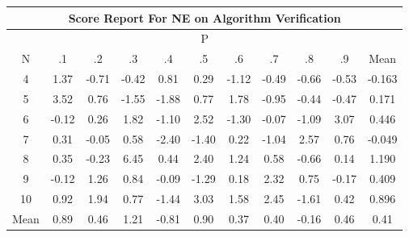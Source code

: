\documentclass[11pt,a4paper]{report}
\begin{document}
\begin{longtable}{ | c || c | c | c | c | c | c | c | c | c || c |}
\hline
\multicolumn{11}{|c|}{ Score Report For NE on Algorithm Verification} \\
\hline
\multicolumn{11}{|c|}{ P } \\
\hline
N & .1 & .2 & .3 & .4 & .5 & .6 & .7 & .8 & .9 & Mean\\
 \hline
 \hline
 \endhead
  4 &  \cellcolor[HTML]{DFDFFF} 1.37 &  \cellcolor[HTML]{FFEFEF} -0.71 &  \cellcolor[HTML]{FFF7F7} -0.42 &  \cellcolor[HTML]{E7E7FF} 0.81 &  \cellcolor[HTML]{F7F7FF} 0.29 &  \cellcolor[HTML]{FFDFDF} -1.12 &  \cellcolor[HTML]{FFEFEF} -0.49 &  \cellcolor[HTML]{FFEFEF} -0.66 &  \cellcolor[HTML]{FFEFEF} -0.53 & -0.163 \\
  5 &  \cellcolor[HTML]{A7A7FF} 3.52 &  \cellcolor[HTML]{EFEFFF} 0.76 &  \cellcolor[HTML]{FFD7D7} -1.55 &  \cellcolor[HTML]{FFCFCF} -1.88 &  \cellcolor[HTML]{EFEFFF} 0.77 &  \cellcolor[HTML]{CFCFFF} 1.78 &  \cellcolor[HTML]{FFE7E7} -0.95 &  \cellcolor[HTML]{FFF7F7} -0.44 &  \cellcolor[HTML]{FFF7F7} -0.47 & 0.171 \\
  6 &  \cellcolor[HTML]{FFFFFF} -0.12 &  \cellcolor[HTML]{F7F7FF} 0.26 &  \cellcolor[HTML]{CFCFFF} 1.82 &  \cellcolor[HTML]{FFE7E7} -1.10 &  \cellcolor[HTML]{BFBFFF} 2.52 &  \cellcolor[HTML]{FFDFDF} -1.30 &  \cellcolor[HTML]{FFFFFF} -0.07 &  \cellcolor[HTML]{FFE7E7} -1.09 &  \cellcolor[HTML]{AFAFFF} 3.07 & 0.446 \\
  7 &  \cellcolor[HTML]{F7F7FF} 0.31 &  \cellcolor[HTML]{FFFFFF} -0.05 &  \cellcolor[HTML]{EFEFFF} 0.58 &  \cellcolor[HTML]{FFBFBF} -2.40 &  \cellcolor[HTML]{FFDFDF} -1.40 &  \cellcolor[HTML]{F7F7FF} 0.22 &  \cellcolor[HTML]{FFE7E7} -1.04 &  \cellcolor[HTML]{BFBFFF} 2.57 &  \cellcolor[HTML]{EFEFFF} 0.76 & -0.049 \\
  8 &  \cellcolor[HTML]{F7F7FF} 0.35 &  \cellcolor[HTML]{FFF7F7} -0.23 &  \cellcolor[HTML]{6060FF} 6.45 &  \cellcolor[HTML]{F7F7FF} 0.44 &  \cellcolor[HTML]{BFBFFF} 2.40 &  \cellcolor[HTML]{DFDFFF} 1.24 &  \cellcolor[HTML]{EFEFFF} 0.58 &  \cellcolor[HTML]{FFEFEF} -0.66 &  \cellcolor[HTML]{FFFFFF} 0.14 & 1.190 \\
  9 &  \cellcolor[HTML]{FFFFFF} -0.12 &  \cellcolor[HTML]{DFDFFF} 1.26 &  \cellcolor[HTML]{E7E7FF} 0.84 &  \cellcolor[HTML]{FFFFFF} -0.09 &  \cellcolor[HTML]{FFDFDF} -1.29 &  \cellcolor[HTML]{F7F7FF} 0.18 &  \cellcolor[HTML]{C7C7FF} 2.32 &  \cellcolor[HTML]{EFEFFF} 0.75 &  \cellcolor[HTML]{FFF7F7} -0.17 & 0.409 \\
  10 &  \cellcolor[HTML]{E7E7FF} 0.92 &  \cellcolor[HTML]{CFCFFF} 1.94 &  \cellcolor[HTML]{EFEFFF} 0.77 &  \cellcolor[HTML]{FFD7D7} -1.44 &  \cellcolor[HTML]{AFAFFF} 3.03 &  \cellcolor[HTML]{D7D7FF} 1.58 &  \cellcolor[HTML]{BFBFFF} 2.45 &  \cellcolor[HTML]{FFD7D7} -1.61 &  \cellcolor[HTML]{F7F7FF} 0.42 & 0.896 \\
 \hline
 \hline
Mean &  \cellcolor[HTML]{E7E7FF} 0.89 &  \cellcolor[HTML]{F7F7FF} 0.46 &  \cellcolor[HTML]{DFDFFF} 1.21 &  \cellcolor[HTML]{FFE7E7} -0.81 &  \cellcolor[HTML]{E7E7FF} 0.90 &  \cellcolor[HTML]{F7F7FF} 0.37 &  \cellcolor[HTML]{F7F7FF} 0.40 &  \cellcolor[HTML]{FFF7F7} -0.16 &  \cellcolor[HTML]{F7F7FF} 0.46 &  \cellcolor[HTML]{F7F7FF} 0.41
\end{longtable}
\end{document}
